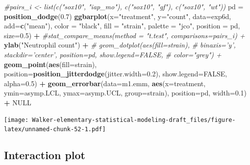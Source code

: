\documentclass[]{book}
\newenvironment{Shaded}{\begin{snugshade}}{\end{snugshade}}
\newcommand{\CommentTok}[1]{\textcolor[rgb]{0.56,0.35,0.01}{\textit{#1}}}
\newcommand{\DataTypeTok}[1]{\textcolor[rgb]{0.13,0.29,0.53}{#1}}
\newcommand{\FloatTok}[1]{\textcolor[rgb]{0.00,0.00,0.81}{#1}}
\newcommand{\KeywordTok}[1]{\textcolor[rgb]{0.13,0.29,0.53}{\textbf{#1}}}
\newcommand{\NormalTok}[1]{#1}
\newcommand{\OperatorTok}[1]{\textcolor[rgb]{0.81,0.36,0.00}{\textbf{#1}}}
\newcommand{\OtherTok}[1]{\textcolor[rgb]{0.56,0.35,0.01}{#1}}
\newcommand{\StringTok}[1]{\textcolor[rgb]{0.31,0.60,0.02}{#1}}
\begin{document}
\begin{Shaded}
\begin{Highlighting}[]
\CommentTok{#pairs_i <- list(c("sox10", "iap_mo"), c("sox10", "gf"), c("sox10", "wt"))}
\NormalTok{pd =}\StringTok{ }\KeywordTok{position_dodge}\NormalTok{(}\FloatTok{0.7}\NormalTok{)}
\KeywordTok{ggbarplot}\NormalTok{(}\DataTypeTok{x=}\StringTok{"treatment"}\NormalTok{, }
          \DataTypeTok{y=}\StringTok{"count"}\NormalTok{,}
          \DataTypeTok{data=}\NormalTok{exp6d,}
          \DataTypeTok{add=}\KeywordTok{c}\NormalTok{(}\StringTok{"mean"}\NormalTok{),}
          \DataTypeTok{color =} \StringTok{"black"}\NormalTok{,}
          \DataTypeTok{fill =} \StringTok{"strain"}\NormalTok{,}
          \DataTypeTok{palette =} \StringTok{"jco"}\NormalTok{,}
          \DataTypeTok{position =}\NormalTok{ pd,}
          \DataTypeTok{size=}\FloatTok{0.5}\NormalTok{) }\OperatorTok{+}
\StringTok{  }\CommentTok{#stat_compare_means(method = "t.test", comparisons=pairs_i) +}
\StringTok{  }\KeywordTok{ylab}\NormalTok{(}\StringTok{"Neutrophil count"}\NormalTok{) }\OperatorTok{+}
\StringTok{  }\CommentTok{# geom_dotplot(aes(fill=strain),}
\StringTok{  }\CommentTok{#              binaxis='y', stackdir='center', position=pd, show.legend=FALSE,}
\StringTok{  }\CommentTok{#              color="grey") +}
\StringTok{  }\KeywordTok{geom_point}\NormalTok{(}\KeywordTok{aes}\NormalTok{(}\DataTypeTok{fill=}\NormalTok{strain), }\DataTypeTok{position=}\KeywordTok{position_jitterdodge}\NormalTok{(}\DataTypeTok{jitter.width=}\FloatTok{0.2}\NormalTok{), }\DataTypeTok{show.legend=}\OtherTok{FALSE}\NormalTok{, }\DataTypeTok{alpha=}\FloatTok{0.5}\NormalTok{) }\OperatorTok{+}
\StringTok{  }\KeywordTok{geom_errorbar}\NormalTok{(}\DataTypeTok{data=}\NormalTok{m1.emm, }\KeywordTok{aes}\NormalTok{(}\DataTypeTok{x=}\NormalTok{treatment, }\DataTypeTok{ymin=}\NormalTok{asymp.LCL, }\DataTypeTok{ymax=}\NormalTok{asymp.UCL, }\DataTypeTok{group=}\NormalTok{strain),}
                \DataTypeTok{position=}\NormalTok{pd, }\DataTypeTok{width=}\FloatTok{0.1}\NormalTok{) }\OperatorTok{+}
\StringTok{  }\OtherTok{NULL}
\end{Highlighting}
\end{Shaded}

\texttt{[image: Walker-elementary-statistical-modeling-draft\_files/figure-latex/unnamed-chunk-52-1.pdf]}

\hypertarget{interaction-plot}{%
\subsection{Interaction plot}\label{interaction-plot}}
\end{document}
